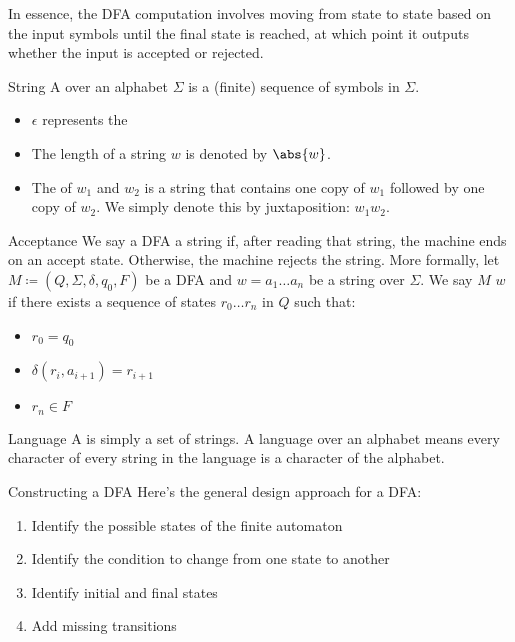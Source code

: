 \documentclass[12pt]{report}
\begin{document}
In essence, the DFA computation involves moving from state to state based on the input symbols until the final state is reached, at which point it outputs whether the input is accepted or rejected.

\begin{dfnbox}{String}{}
    A  over an alphabet $\Sigma$ is a (finite) sequence of symbols in $\Sigma$.
    \begin{itemize}[noitemsep]
        \item $\epsilon$ represents the 
        \item The length of a string $w$ is denoted by $\abs{w}$.
        \item The  of $w_1$ and $w_2$ is a string that contains one copy of $w_1$ followed by one copy of $w_2$. We simply denote this by juxtaposition: $w_1 w_2$.
    \end{itemize}
\end{dfnbox}

\begin{dfnbox}{Acceptance}{}
    We say a DFA  a string if, after reading that string, the machine ends on an accept state. Otherwise, the machine rejects the string.
    \tcblower
    More formally, let $M \coloneq (Q, \Sigma, \delta, q_0, F)$ be a DFA and $w = a_1 \ldots a_n$ be a string over $\Sigma$. We say $M$  $w$ if there exists a sequence of states $r_0 \ldots r_n$ in $Q$ such that:
    \begin{itemize}[noitemsep]
        \item $r_0 = q_0$
        \item $\delta(r_i, a_{i+1}) = r_{i+1}$
        \item $r_n \in F$
    \end{itemize}
\end{dfnbox}

\begin{dfnbox}{Language}{}
    A  is simply a set of strings. A language over an alphabet means every character of every string in the language is a character of the alphabet.
\end{dfnbox}

\begin{tecbox}{Constructing a DFA}{}
    Here's the general design approach for a DFA:
    \begin{enumerate}[noitemsep]
        \item Identify the possible states of the finite automaton
        \item Identify the condition to change from one state to another
        \item Identify initial and final states
        \item Add missing transitions
    \end{enumerate}
\end{tecbox}
\end{document}
